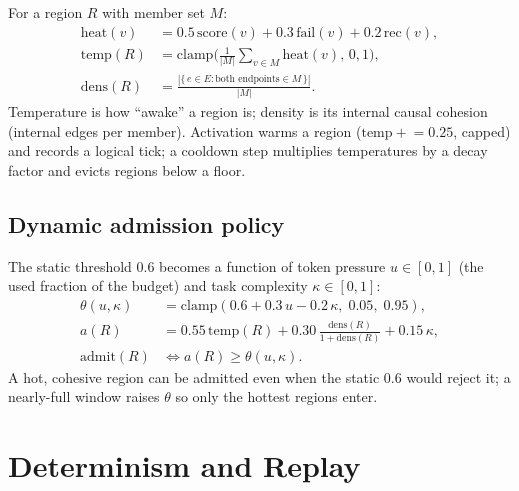 \documentclass[11pt]{article}
\begin{document}
For a region $R$ with member set $M$:
\begin{align}
\mathrm{heat}(v)        &= 0.5\,\mathrm{score}(v) + 0.3\,\mathrm{fail}(v) + 0.2\,\mathrm{rec}(v), \\
\mathrm{temp}(R)        &= \mathrm{clamp}\!\Big(\tfrac{1}{|M|}\textstyle\sum_{v\in M}\mathrm{heat}(v),\,0,1\Big), \label{eq:temp}\\
\mathrm{dens}(R)        &= \frac{|\{\,e\in E : \text{both endpoints} \in M\,\}|}{|M|}. \label{eq:dens}
\end{align}
Temperature is how ``awake'' a region is; density is its internal causal cohesion
(internal edges per member). Activation warms a region
($\mathrm{temp}\mathrel{+}=0.25$, capped) and records a logical tick; a cooldown
step multiplies temperatures by a decay factor and evicts regions below a floor.

\subsection{Dynamic admission policy}\label{sec:policy}

The static threshold $0.6$ becomes a function of token pressure $u\in[0,1]$ (the
used fraction of the budget) and task complexity $\kappa\in[0,1]$:
\begin{align}
\theta(u,\kappa)       &= \mathrm{clamp}(0.6 + 0.3\,u - 0.2\,\kappa,\; 0.05,\; 0.95), \\
a(R)                   &= 0.55\,\mathrm{temp}(R) + 0.30\,\frac{\mathrm{dens}(R)}{1+\mathrm{dens}(R)} + 0.15\,\kappa, \\
\mathrm{admit}(R)      &\iff a(R) \ge \theta(u,\kappa).
\end{align}
A hot, cohesive region can be admitted even when the static $0.6$ would reject it;
a nearly-full window raises $\theta$ so only the hottest regions enter.

\section{Determinism and Replay}\label{sec:determinism}
\end{document}
